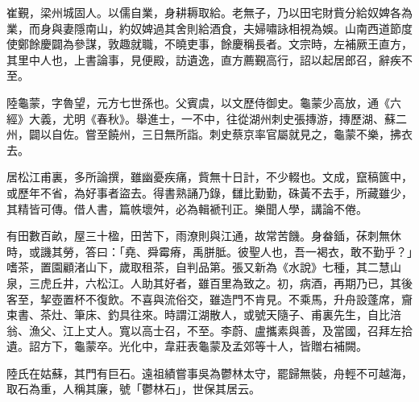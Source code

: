 \begin{pinyinscope}
 崔覲，梁州城固人。以儒自業，身耕耨取給。老無子，乃以田宅財貲分給奴婢各為業，而身與妻隱南山，約奴婢過其舍則給酒食，夫婦嘯詠相視為娛。山南西道節度使鄭餘慶闢為參謀，敦趣就職，不曉吏事，餘慶稱長者。文宗時，左補厥王直方，其里中人也，上書論事，見便殿，訪遺逸，直方薦覲高行，詔以起居郎召，辭疾不至。



 陸龜蒙，字魯望，元方七世孫也。父賓虞，以文歷侍御史。龜蒙少高放，通《六經》大義，尤明《春秋》。舉進士，一不中，往從湖州刺史張摶游，摶歷湖、蘇二州，闢以自佐。嘗至饒州，三日無所詣。刺史蔡京率官屬就見之，龜蒙不樂，拂衣去。



 居松江甫裏，多所論撰，雖幽憂疾痛，貲無十日計，不少輟也。文成，竄稿篋中，或歷年不省，為好事者盜去。得書熟誦乃錄，讎比勤勤，硃黃不去手，所藏雖少，其精皆可傳。借人書，篇帙壞舛，必為輯褫刊正。樂聞人學，講論不倦。



 有田數百畝，屋三十楹，田苦下，雨潦則與江通，故常苦饑。身畚鍤，茠刺無休時，或譏其勞，答曰：「堯、舜霉瘠，禹胼胝。彼聖人也，吾一褐衣，敢不勤乎？」嗜茶，置園顧渚山下，歲取租茶，自判品第。張又新為《水說》七種，其二慧山泉，三虎丘井，六松江。人助其好者，雖百里為致之。初，病酒，再期乃已，其後客至，挈壺置杯不復飲。不喜與流俗交，雖造門不肯見。不乘馬，升舟設蓬席，齎束書、茶灶、筆床、釣具往來。時謂江湖散人，或號天隨子、甫裏先生，自比涪翁、漁父、江上丈人。寬以高士召，不至。李蔚、盧攜素與善，及當國，召拜左拾遺。詔方下，龜蒙卒。光化中，韋莊表龜蒙及孟郊等十人，皆贈右補闕。



 陸氏在姑蘇，其門有巨石。遠祖績嘗事吳為鬱林太守，罷歸無裝，舟輕不可越海，取石為重，人稱其廉，號「鬱林石」，世保其居云。



\end{pinyinscope}